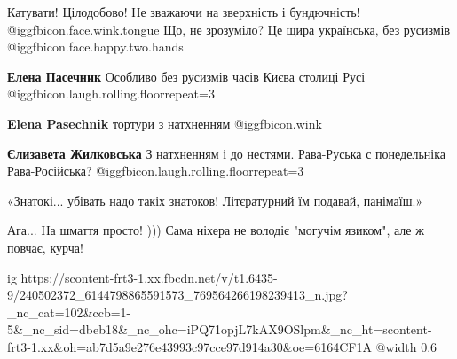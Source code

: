Катувати! Цілодобово! Не зважаючи на зверхність і бундючність!   @igg{fbicon.face.wink.tongue}  Що, не
зрозуміло? Це щира українська, без русизмів @igg{fbicon.face.happy.two.hands} 

\begin{itemize} %
 
\textbf{Елена Пасечник} Особливо без русизмів часів Києва столиці Русі  @igg{fbicon.laugh.rolling.floor}{repeat=3} 

 
\textbf{Elena Pasechnik} тортури з натхненням  @igg{fbicon.wink} 

 
\textbf{Єлизавета Жилковська} З натхненням і до нестями. Рава-Руська с понедельніка Рава-Російська?  @igg{fbicon.laugh.rolling.floor}{repeat=3} 
\end{itemize} %

 
«Знатокі... убівать надо такіх знатоков! Літєратурний їм подавай, панімаїш.»

 
Ага... На шмаття просто! )))
Сама ніхера не володіє "могучім язиком", але ж повчає, курча!

\ifcmt
  ig https://scontent-frt3-1.xx.fbcdn.net/v/t1.6435-9/240502372_6144798865591573_769564266198239413_n.jpg?_nc_cat=102&ccb=1-5&_nc_sid=dbeb18&_nc_ohc=iPQ71opjL7kAX9OSlpm&_nc_ht=scontent-frt3-1.xx&oh=ab7d5a9e276e43993c97cce97d914a30&oe=6164CF1A
  @width 0.6
\fi

